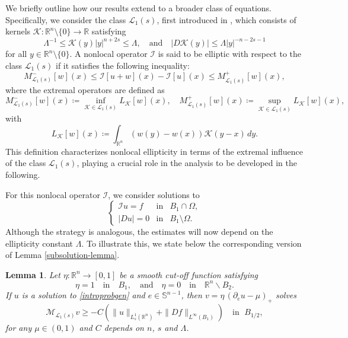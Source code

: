 \documentclass[reqno,11pt]{amsart}
\newtheorem{lemma}{Lemma}[section]
\numberwithin{equation}{section}
\numberwithin{equation}{section}
\begin{document}
We briefly outline how our results extend to a broader class of equations. Specifically, we consider the class \( \mathcal{L}_1(s) \), first introduced in \cite{CS09}, which consists of kernels \( \mathcal{K} \colon \mathbb{R}^n \setminus \{0\} \to \mathbb{R} \) satisfying  
\[
    \Lambda^{-1} \leq \mathcal{K}(y)|y|^{n+2s} \leq \Lambda, \quad \text{and} \quad |D\mathcal{K}(y)| \leq \Lambda |y|^{-n-2s-1} 
\]
for all \( y \in \mathbb{R}^n \setminus \{0\} \). A nonlocal operator \( \mathcal{I} \) is said to be elliptic with respect to the class \( \mathcal{L}_1(s) \) if it satisfies the following inequality:  
\begin{equation}
	M^-_{\mathcal{L}_1(s)}[w](x) \leq \mathcal{I}[u+w](x) - \mathcal{I}[u](x) \leq M^+_{\mathcal{L}_1(s)}[w](x),
\end{equation}  
where the extremal operators are defined as  
\[
	M^-_{\mathcal{L}_1(s)}[w](x) \coloneqq \inf_{\mathcal{K} \in \mathcal{L}_1(s)}L_{\mathcal{K}}[w](x), \quad M^+_{\mathcal{L}_1(s)}[w](x) \coloneqq \sup_{\mathcal{K} \in \mathcal{L}_1(s)}L_{\mathcal{K}}[w](x),
\]  
with  
\[
    L_{\mathcal{K}}[w](x) \coloneqq \int_{\mathbb{R}^n} (w(y)-w(x)) \mathcal{K}(y-x) \, dy.
\]  
This definition characterizes nonlocal ellipticity in terms of the extremal influence of the class \( \mathcal{L}_1(s) \), playing a crucial role in the analysis to be developed in the following.

For this nonlocal operator $\mathcal{I}$, we consider solutions to
\begin{equation}\label{introprobgen}
\left\{
\begin{array}{rcl}
\mathcal{I} u = f & \text{in} & B_1 \cap \Omega, \\[0.1cm]
|Du| = 0 & \text{in} & B_1 \setminus \Omega.
\end{array}
\right.
\end{equation}
Although the strategy is analogous, the estimates will now depend on the ellipticity constant \( \Lambda \). To illustrate this, we state below the corresponding version of Lemma \ref{subsolution-lemma}.

\begin{lemma}
Let $\eta \colon \mathbb{R}^n \to [0,1]$ be a smooth cut-off function satisfying
$$
    \eta = 1 \quad \mbox{in} \quad  B_1, \quad \mbox{and} \quad \eta = 0 \quad \mbox{in} \quad \mathbb{R}^n \backslash B_2.
$$
If $u$ is a solution to \eqref{introprobgen} and $e \in \mathbb{S}^{n-1}$, then $v = \eta\,(\partial_e u - \mu)_+$ solves
$$
    \mathcal{M}_{\mathcal{L}_1(s)}v \geq -C\left(\|u\|_{L^1_s(\mathbb{R}^n)} +\|Df\|_{L^\infty(B_1)} \right)\quad \mbox{in }\; B_{1/2},
$$
for any $\mu \in (0,1)$ and $C$ depends on $n$, $s$ and $\Lambda$.
\end{lemma}
\end{document}
